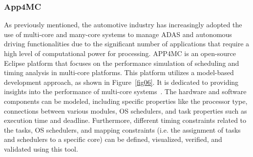 \subsubsection{App4MC} %
As previously mentioned, the automotive industry has increasingly adopted the use of multi-core and many-core systems to manage ADAS and autonomous driving functionalities due to the significant number of applications that require a high level of computational power for processing.
APP4MC is an open-source Eclipse platform that focuses on the performance simulation of scheduling and timing analysis in multi-core platforms. This platform utilizes a model-based development approach, as shown in Figure~\ref{fig06}. It is dedicated to providing insights into the performance of multi-core systems~\cite{hottger2015model,hottger2017app4mc}.
The hardware and software components can be modeled, including specific properties like the processor type, connections between various modules, OS schedulers, and task properties such as execution time and deadline. Furthermore, different timing constraints related to the tasks, OS schedulers, and mapping constraints (i.e. the assignment of tasks and schedulers to a specific core) can be defined, visualized, verified, and validated using this tool.

